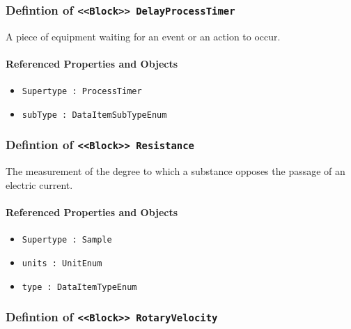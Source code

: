 \subsubsection{Defintion of \texttt{<<Block>> DelayProcessTimer}}
  \label{type:DelayProcessTimer}

\FloatBarrier

A piece of equipment waiting for an event or an action to occur.

\FloatBarrier
\paragraph{Referenced Properties and Objects}

\begin{itemize}
\item \texttt{Supertype : ProcessTimer}

\item \texttt{subType : DataItemSubTypeEnum}

\end{itemize}
\FloatBarrier
\subsubsection{Defintion of \texttt{<<Block>> Resistance}}
  \label{type:Resistance}

\FloatBarrier

The measurement of the degree to which a substance opposes the passage of an electric current.

\FloatBarrier
\paragraph{Referenced Properties and Objects}

\begin{itemize}
\item \texttt{Supertype : Sample}

\item \texttt{units : UnitEnum}

\item \texttt{type : DataItemTypeEnum}

\end{itemize}
\FloatBarrier
\subsubsection{Defintion of \texttt{<<Block>> RotaryVelocity}}
  \label{type:RotaryVelocity}

\FloatBarrier

